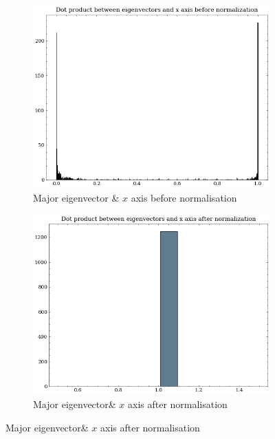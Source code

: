 \begin{figure}[H]
    \centering
    \begin{subfigure}[b]{0.45\textwidth}
        \centering
        \includegraphics[width=\textwidth]{assets/preprocessing/Dot_product_between_eigenvectors_and_x_axis_before_normalization.png}
        \caption{Major eigenvector \& $x$ axis before normalisation}
        \label{fig:resampling-alignment-x-before}
    \end{subfigure}
    \hfill
    \begin{subfigure}[b]{0.45\textwidth}
        \centering
        \includegraphics[width=\textwidth]{assets/preprocessing/Dot_product_between_eigenvectors_and_x_axis_after_normalization.png}
        \caption{Major eigenvector\& $x$ axis after normalisation}
        \label{fig:resampling-alignment-x-after}
    \end{subfigure}
    

\end{figure}
